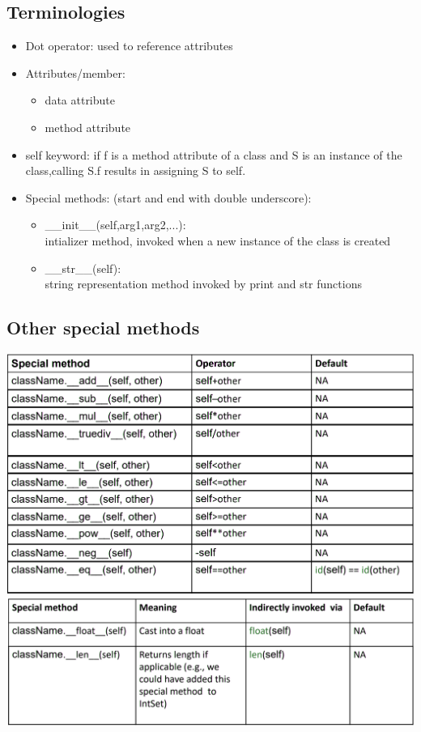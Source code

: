 \documentclass[12pt,oneside]{book}
\begin{document}
\subsection{Terminologies}
\begin{itemize}
	\item Dot operator: used to reference attributes
	\item Attributes/member:
	      \begin{itemize}
		      \item data attribute
		      \item method attribute
	      \end{itemize}
	\item self keyword: if f is a method attribute of a class and S is an instance of the class,calling S.f results in assigning S to self.
	\item Special methods: (start and end with double underscore):
	      \begin{itemize}
		      \item \_\_init\_\_(self,arg1,arg2,...):\\
		            intializer method, invoked when a new instance of the class is created
		      \item \_\_str\_\_(self):\\
		            string representation method invoked by print and str functions
	      \end{itemize}
\end{itemize}
\subsection{Other special methods }
\begin{center}
	\includegraphics[width=0.8\linewidth]{../pic/python/21.png}
	\includegraphics[width=0.8\linewidth]{../pic/python/22.png}
\end{center}
\end{document}
